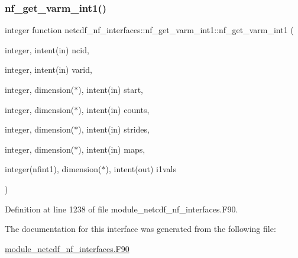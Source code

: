 \subsubsection{\texorpdfstring{nf\+\_\+get\+\_\+varm\+\_\+int1()}{nf\_get\_varm\_int1()}}
{\footnotesize\ttfamily integer function netcdf\+\_\+nf\+\_\+interfaces\+::nf\+\_\+get\+\_\+varm\+\_\+int1\+::nf\+\_\+get\+\_\+varm\+\_\+int1 (\begin{DoxyParamCaption}\item[{integer, intent(in)}]{ncid,  }\item[{integer, intent(in)}]{varid,  }\item[{integer, dimension($\ast$), intent(in)}]{start,  }\item[{integer, dimension($\ast$), intent(in)}]{counts,  }\item[{integer, dimension($\ast$), intent(in)}]{strides,  }\item[{integer, dimension($\ast$), intent(in)}]{maps,  }\item[{integer(nfint1), dimension($\ast$), intent(out)}]{i1vals }\end{DoxyParamCaption})}



Definition at line 1238 of file module\+\_\+netcdf\+\_\+nf\+\_\+interfaces.\+F90.



The documentation for this interface was generated from the following file\+:\begin{DoxyCompactItemize}
\item 
\hyperlink{module__netcdf__nf__interfaces_8F90}{module\+\_\+netcdf\+\_\+nf\+\_\+interfaces.\+F90}\end{DoxyCompactItemize}

